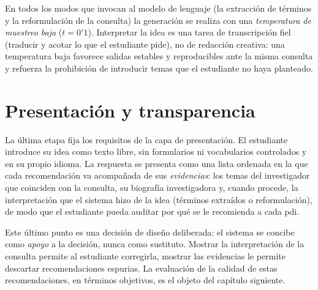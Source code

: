 En todos los modos que invocan al modelo de lenguaje (la extracción de términos y la reformulación de la consulta) la generación se realiza con una \emph{temperatura de muestreo baja} ($t=0'1$).
Interpretar la idea es una tarea de transcripción fiel (traducir y acotar lo que el estudiante pide), no de redacción creativa: una temperatura baja favorece salidas estables y reproducibles ante la misma consulta y refuerza la prohibición de introducir temas que el estudiante no haya planteado.

\section{Presentación y transparencia}
\label{sec:met-presentacion}

La última etapa fija los requisitos de la capa de presentación.
El estudiante introduce su idea como texto libre, sin formularios ni vocabularios controlados y en su propio idioma.
La respuesta se presenta como una lista ordenada en la que cada recomendación va acompañada de sus \emph{evidencias}: los temas del investigador que coinciden con la consulta, su biografía investigadora y, cuando procede, la interpretación que el sistema hizo de la idea (términos extraídos o reformulación), de modo que el estudiante pueda auditar por qué se le recomienda a cada \gls{pdi}.

Este último punto es una decisión de diseño deliberada: el sistema se concibe como \emph{apoyo} a la decisión, nunca como sustituto.
Mostrar la interpretación de la consulta permite al estudiante corregirla, mostrar las evidencias le permite descartar recomendaciones espurias.
La evaluación de la calidad de estas recomendaciones, en términos objetivos, es el objeto del capítulo siguiente.
